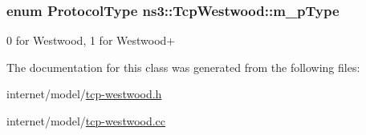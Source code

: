 \subsubsection[{\texorpdfstring{m\+\_\+p\+Type}{m_pType}}]{\setlength{\rightskip}{0pt plus 5cm}enum {\bf Protocol\+Type} ns3\+::\+Tcp\+Westwood\+::m\+\_\+p\+Type\hspace{0.3cm}{\ttfamily [protected]}}\hypertarget{classns3_1_1TcpWestwood_a204ec8fc69424e246a4a9b0be0c0586f}{}\label{classns3_1_1TcpWestwood_a204ec8fc69424e246a4a9b0be0c0586f}


0 for Westwood, 1 for Westwood+ 



The documentation for this class was generated from the following files\+:\begin{DoxyCompactItemize}
\item 
internet/model/\hyperlink{tcp-westwood_8h}{tcp-\/westwood.\+h}\item 
internet/model/\hyperlink{tcp-westwood_8cc}{tcp-\/westwood.\+cc}\end{DoxyCompactItemize}
